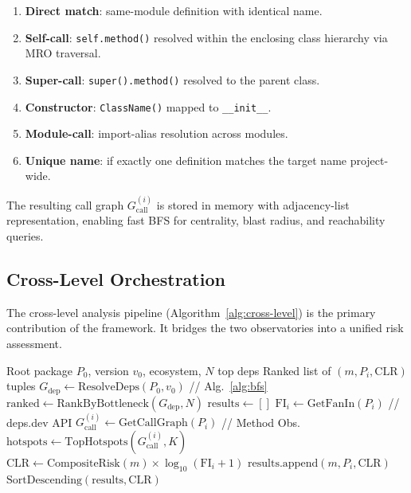\documentclass[conference]{IEEEtran}
\begin{document}
\begin{enumerate}
    \item \textbf{Direct match}: same-module definition with identical name.
    \item \textbf{Self-call}: \texttt{self.method()} resolved within the enclosing class hierarchy via MRO traversal.
    \item \textbf{Super-call}: \texttt{super().method()} resolved to the parent class.
    \item \textbf{Constructor}: \texttt{ClassName()} mapped to \texttt{\_\_init\_\_}.
    \item \textbf{Module-call}: import-alias resolution across modules.
    \item \textbf{Unique name}: if exactly one definition matches the target name project-wide.
\end{enumerate}

The resulting call graph $G_{\mathrm{call}}^{(i)}$ is stored in memory with adjacency-list representation, enabling fast BFS for centrality, blast radius, and reachability queries.

\subsection{Cross-Level Orchestration}
\label{subsec:orchestration}

The cross-level analysis pipeline (Algorithm~\ref{alg:cross-level}) is the primary contribution of the framework. It bridges the two observatories into a unified risk assessment.

\begin{algorithm}[t]
\caption{Cross-Level Risk Analysis}
\label{alg:cross-level}
\begin{algorithmic}[1]
\REQUIRE Root package $P_0$, version $v_0$, ecosystem, $N$ top deps
\ENSURE Ranked list of $(m, P_i, \mathrm{CLR})$ tuples
\STATE $G_{\mathrm{dep}} \gets \mathrm{ResolveDeps}(P_0, v_0)$ \hfill // Alg.~\ref{alg:bfs}
\STATE $\mathrm{ranked} \gets \mathrm{RankByBottleneck}(G_{\mathrm{dep}}, N)$
\STATE $\mathrm{results} \gets []$
    \STATE $\mathrm{FI}_i \gets \mathrm{GetFanIn}(P_i)$ \hfill // deps.dev API
    \STATE $G_{\mathrm{call}}^{(i)} \gets \mathrm{GetCallGraph}(P_i)$ \hfill // Method Obs.
    \STATE $\mathrm{hotspots} \gets \mathrm{TopHotspots}(G_{\mathrm{call}}^{(i)}, K)$
        \STATE $\mathrm{CLR} \gets \mathrm{CompositeRisk}(m) \times \log_{10}(\mathrm{FI}_i + 1)$
        \STATE $\mathrm{results}.\mathrm{append}(m, P_i, \mathrm{CLR})$
    \ENDFOR
\ENDFOR
\RETURN $\mathrm{SortDescending}(\mathrm{results}, \mathrm{CLR})$
\end{algorithmic}
\end{algorithm}
\end{document}
